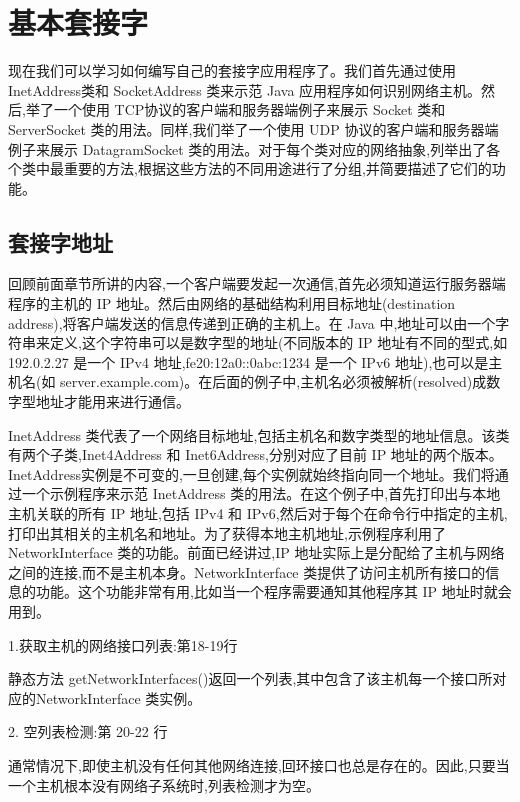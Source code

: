 
\chapter{基本套接字}

	现在我们可以学习如何编写自己的套接字应用程序了。我们首先通过使用 InetAddress类和 SocketAddress 类来示范 Java 应用程序如何识别网络主机。然后,举了一个使用 TCP协议的客户端和服务器端例子来展示 Socket 类和 ServerSocket 类的用法。同样,我们举了一个使用 UDP 协议的客户端和服务器端例子来展示 DatagramSocket 类的用法。对于每个类对应的网络抽象,列举出了各个类中最重要的方法,根据这些方法的不同用途进行了分组,并简要描述了它们的功能。

	\section{套接字地址}

		回顾前面章节所讲的内容,一个客户端要发起一次通信,首先必须知道运行服务器端程序的主机的 IP 地址。然后由网络的基础结构利用目标地址(destination address),将客户端发送的信息传递到正确的主机上。在 Java 中,地址可以由一个字符串来定义,这个字符串可以是数字型的地址(不同版本的 IP 地址有不同的型式,如 192.0.2.27 是一个 IPv4 地址,fe20:12a0::0abc:1234 是一个 IPv6 地址),也可以是主机名(如 server.example.com)。在后面的例子中,主机名必须被解析(resolved)成数字型地址才能用来进行通信。

		InetAddress 类代表了一个网络目标地址,包括主机名和数字类型的地址信息。该类有两个子类,Inet4Address 和 Inet6Address,分别对应了目前 IP 地址的两个版本。InetAddress实例是不可变的,一旦创建,每个实例就始终指向同一个地址。我们将通过一个示例程序来示范 InetAddress 类的用法。在这个例子中,首先打印出与本地主机关联的所有 IP 地址,包括 IPv4 和 IPv6,然后对于每个在命令行中指定的主机,打印出其相关的主机名和地址。为了获得本地主机地址,示例程序利用了 NetworkInterface 类的功能。前面已经讲过,IP 地址实际上是分配给了主机与网络之间的连接,而不是主机本身。NetworkInterface 类提供了访问主机所有接口的信息的功能。这个功能非常有用,比如当一个程序需要通知其他程序其 IP 地址时就会用到。

		

		1.获取主机的网络接口列表:第18-19行

		静态方法 getNetworkInterfaces()返回一个列表,其中包含了该主机每一个接口所对应的NetworkInterface 类实例。

		2. 空列表检测:第 20-22 行

		通常情况下,即使主机没有任何其他网络连接,回环接口也总是存在的。因此,只要当一个主机根本没有网络子系统时,列表检测才为空。

